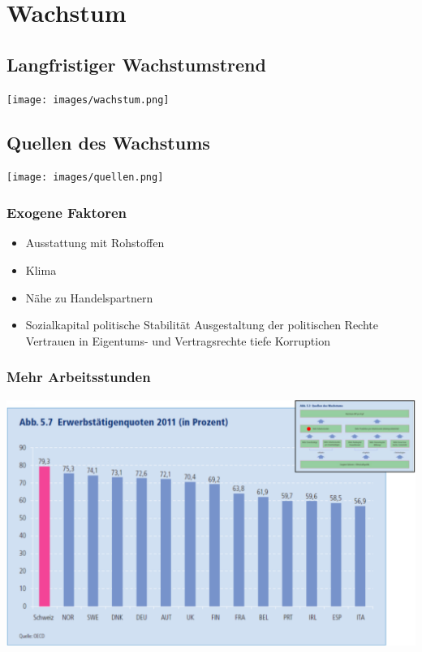 \section{Wachstum}
\begin{multicols}{2}
\subsection{Langfristiger Wachstumstrend}
\texttt{[image: images/wachstum.png]}
\columnbreak

\subsection{Quellen des Wachstums}
\texttt{[image: images/quellen.png]}
\end{multicols}

\begin{multicols}{2}
\subsubsection{Exogene Faktoren}
\begin{itemize}
	\item Ausstattung mit Rohstoffen
	\item Klima
	\item Nähe zu Handelspartnern
	\item Sozialkapital
	\subitem politische Stabilität
	\subitem Ausgestaltung der politischen Rechte
	\subitem Vertrauen in Eigentums- und Vertragsrechte
	\subitem tiefe Korruption
\end{itemize}
\vfill\null
\columnbreak
\subsubsection{Mehr Arbeitsstunden}
\includegraphics[width=\linewidth]{images/arbeitsstunden.png}
\end{multicols}

